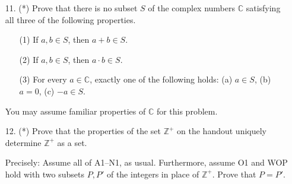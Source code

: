 \documentclass[11pt]{article}
\def\C{\mathbb{C}}
\theoremstyle{plain}
\theoremstyle{remark}
\begin{document}
\begin{enumerate}

\item[11.] (*) Prove that there is no subset $S$ of the complex numbers $\mathbb{C}$ satisfying all three of the following properties.
    \begin{enumerate}
    \item[(1)] If $a, b \in S$, then $a+b \in S$.
    \item[(2)] If $a, b \in S$, then $a\cdot b \in S$.
    \item[(3)] For every $a \in \C$, exactly one of the following holds: (a) $a\in S$, (b) $a=0$, (c) $-a \in S$.
    \end{enumerate}
You may assume familiar properties of $\C$ for this problem.

\item[12.] (*) Prove that the properties of the set $\mathbb{Z}^{+}$ on the handout uniquely determine $\mathbb{Z}^{+}$ as a set. 

Precisely: Assume all of A1--N1, as usual. Furthermore, assume O1 and WOP hold with two subsets $P, P'$ of the integers in place of $\mathbb{Z}^{+}$. Prove that $P=P'$.
\end{enumerate}
\end{document}
